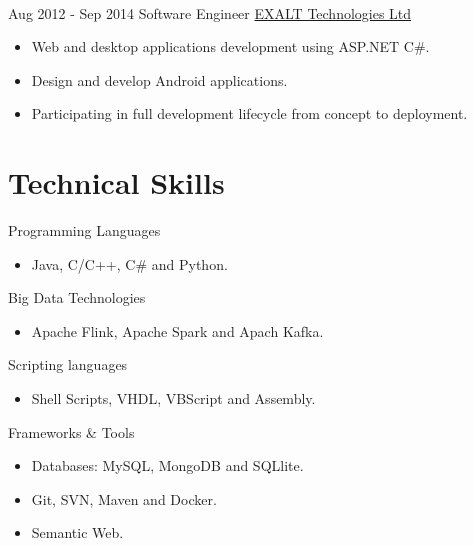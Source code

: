 \documentclass[letterpaper]{twentysecondcv} %
\begin{document}
\begin{twenty}
{{\begin{itemize}
        
    \end{itemize}}
        }
     \\
     \twentyitem
   		{Aug 2012 -}
		{Sep 2014}
        {Software Engineer}
        {\href{http://www.exalt-tech.com/about/}{EXALT Technologies Ltd}}
        {}
        {
        \begin{itemize}
        \item Web and desktop applications development using ASP.NET C\#.
        \item Design and develop Android applications. 
        \item Participating in full development lifecycle from concept to deployment.
        
    \end{itemize}
    	}
        
\end{twenty}

\section{Technical  Skills}
\begin{twenty} %
	\twentyitem
	{}
	{}
	{Programming Languages}
	{}
	{}
	{ \begin{itemize}
			\item Java, C/C++, C\# and  Python.	\\	
	\end{itemize}}
		\twentyitem
	{}
	{}
	{Big Data Technologies}
	{}
	{}
	{ \begin{itemize}
			\item Apache Flink,  Apache
			Spark and Apach Kafka.	\\	
	\end{itemize}}

		\twentyitem
{}
{}
{Scripting languages}
{}
{}
{ \begin{itemize}
		\item Shell Scripts, VHDL, VBScript and Assembly.	\\	
\end{itemize}}



	\twentyitem
{}
{}
{Frameworks \& Tools}
{}
{}
{ \begin{itemize}
		\item Databases: MySQL,    MongoDB and SQLlite.
		\item Git, SVN, Maven and Docker.
		\item Semantic Web.
		
\end{itemize}}
\end{twenty}
\end{document}
